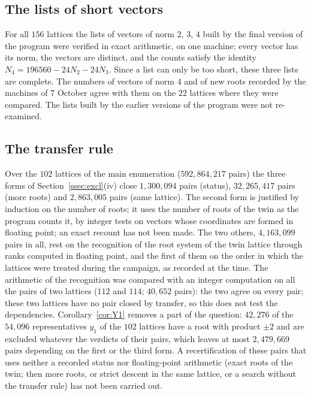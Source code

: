 \documentclass[11pt]{amsart}
\theoremstyle{definition}
\theoremstyle{remark}
\begin{document}
\subsection*{The lists of short vectors} For all $156$ lattices the lists of vectors of norm $2$, $3$, $4$ built by the
final version of the program were verified in exact arithmetic, on one machine: every vector has its norm, the vectors are
distinct, and the counts satisfy the identity $N_4=196560-24N_2-24N_3$. Since a list can only be too short, these three
lists are complete. The numbers of vectors of norm $4$ and of new roots recorded by the machines of 7 October agree with
them on the $22$ lattices where they were compared. The lists built by the earlier versions of the program were not
re-examined.

\subsection*{The transfer rule} Over the $102$ lattices of the main enumeration ($592{,}864{,}217$ pairs) the three forms
of Section~\ref{ssec:excl}(iv) close $1{,}300{,}094$ pairs (status), $32{,}265{,}417$ pairs (more roots) and $2{,}863{,}005$
pairs (same lattice). The second form is justified by induction on the number of roots; it uses the number of roots of the
twin as the program counts it, by integer tests on vectors whose coordinates are formed in floating point; an exact recount
has not been made. The two others, $4{,}163{,}099$ pairs in all, rest on the recognition of the root system of the twin
lattice through ranks computed in floating point, and the first of them on the order in which the lattices were treated
during the campaign, as recorded at the time. The arithmetic of the recognition was compared with an integer computation on
all the pairs of two lattices ($112$ and $114$; $40{,}652$ pairs): the two agree on every pair; these two lattices have no
pair closed by transfer, so this does not test the dependencies. Corollary~\ref{cor:Y1} removes a part of the question:
$42{,}276$ of the $54{,}096$ representatives $y_1$ of the $102$ lattices have a root with product $\pm2$ and are excluded
whatever the verdicts of their pairs, which leaves at most $2{,}479{,}669$ pairs depending on the first or the third form. A
recertification of these pairs that uses neither a recorded status nor floating-point arithmetic (exact roots of the twin;
then more roots, or strict descent in the same lattice, or a search without the transfer rule) has not been carried out.
\end{document}
